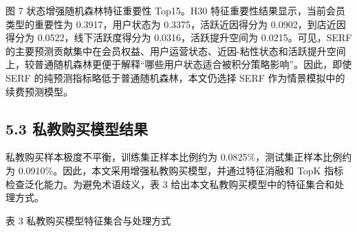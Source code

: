 \documentclass[
  12pt,
]{ctexart}
\begin{document}
\begin{center}\small 图 7 状态增强随机森林特征重要性 Top15。H30 特征重要性结果显示，当前会员类型的重要性为 0.3917，用户状态为 0.3375，活跃近因得分为 0.0902，到店近因得分为 0.0522，线下活跃度得分为 0.0316，活跃提升空间为 0.0215。可见，SERF 的主要预测贡献集中在会员权益、用户运营状态、近因-粘性状态和活跃提升空间上，较普通随机森林更便于解释``哪些用户状态适合被积分策略影响''。因此，即使 SERF 的纯预测指标略低于普通随机森林，本文仍选择 SERF 作为情景模拟中的续费预测模型。\end{center}

\hypertarget{ux79c1ux6559ux8d2dux4e70ux6a21ux578bux7ed3ux679c}{%
\subsection{5.3 私教购买模型结果}\label{ux79c1ux6559ux8d2dux4e70ux6a21ux578bux7ed3ux679c}}

私教购买样本极度不平衡，训练集正样本比例约为 0.0825\%，测试集正样本比例约为 0.0910\%。因此，本文采用增强私教购买模型，并通过特征消融和 TopK 指标检查泛化能力。为避免术语歧义，表 3 给出本文私教购买模型中的特征集合和处理方式。

\begin{center}\small 表 3 私教购买模型特征集合与处理方式\end{center}
\end{document}
